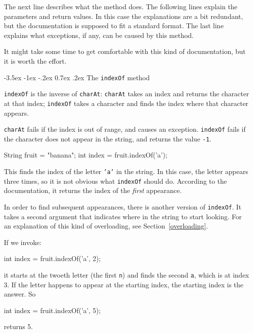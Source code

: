 \documentclass{book}
\makeatletter
\renewcommand{\section}{\@startsection 
    {section} {1} {0mm}%
    {-3.5ex \@plus -1ex \@minus -.2ex}%
    {0.7ex \@plus.2ex}%
    {\normalfont\Large\bfseries}}
\makeatother
\begin{document}
The next line describes what the method does.  The following
lines explain the parameters and return values.  In this case
the explanations are a bit redundant, but the documentation is
supposed to fit a standard format.  The last line explains what
exceptions, if any, can be caused by this method.

It might take some time to get 
comfortable with this kind of documentation, but it is worth the effort.


\section{The {\tt indexOf} method}

{\tt indexOf} is the inverse of {\tt charAt}:
{\tt charAt} takes an index and returns the character at that
index;  {\tt indexOf} takes a character and finds the index
where that character appears.

{\tt charAt} fails if the index is out of range, and causes an
exception.  {\tt indexOf} fails if the character does not appear in
the string, and returns the value {\tt -1}.

\begin{verbatimtab}
    String fruit = "banana";
    int index = fruit.indexOf('a');
\end{verbatimtab}
%
This finds the index of the letter {\tt 'a'} in the string.
In this case, the letter appears three times, so it is not
obvious what {\tt indexOf} should do.  According to the
documentation, it returns the index of the {\em first} appearance.

In order to find subsequent appearances, there is another
version of {\tt indexOf}.  It takes a
second argument that indicates where in the string to start
looking.  For an explanation of this kind
of overloading, see Section~\ref{overloading}.

If we invoke:

\begin{verbatimtab}
    int index = fruit.indexOf('a', 2);
\end{verbatimtab}
%
it starts at the twoeth letter (the first {\tt n}) and finds
the second {\tt a}, which is at index 3.  If the letter happens
to appear at the starting index, the starting index is the
answer.  So

\begin{verbatimtab}
    int index = fruit.indexOf('a', 5);
\end{verbatimtab}
%
returns 5.  
\end{document}
